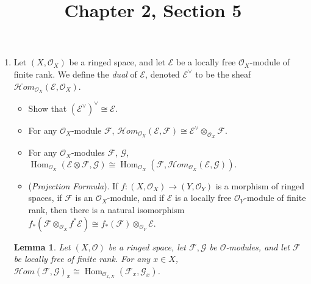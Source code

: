 \documentclass{article}
\title{Chapter 2, Section 5}
\newcommand{\fF}{\mathcal{F}}
\newcommand{\fG}{\mathcal{G}}
\newcommand{\fE}{\mathcal{E}}
\newcommand{\fO}{\mathcal{O}}
\newtheorem{lemma}{Lemma}
\DeclareMathOperator{\Hom}{Hom}
\begin{document}
\maketitle
\begin{enumerate} [label=\textbf{\arabic*.}, leftmargin=0em]


\item[\textbf{1.}] Let $(X, \fO_X)$ be a ringed space, and let $\fE$ be a locally free $\fO_X$-module of finite rank. We define the \textit{dual} of $\fE$, denoted $\fE^\vee$ to be the sheaf $\mathcal{H}om_{\fO_X}(\fE, \fO_X)$.
\begin{itemize} [leftmargin=0em]
    \item[(a)] Show that $(\fE^\vee)^\vee \cong \fE$.
    \item[(b)] For any $\fO_X$-module $\fF$, $\mathcal{H}om_{\fO_X}(\fE, \fF) \cong \fE^\vee \otimes_{\fO_X} \fF$.
    \item[(c)] For any $\fO_X$-modules $\fF$, $\fG$, $\Hom_{\fO_X}(\fE \otimes \fF, \fG) \cong \Hom_{\fO_X}(\fF, \mathcal{H}om_{\fO_X}(\fE, \fG)).$
    \item[(d)] (\textit{Projection Formula}). If $f : (X, \fO_X) \to (Y, \fO_Y)$ is a morphism of ringed spaces, if $\fF$ is an $\fO_X$-module, and if $\fE$ is a locally free $\fO_Y$-module of finite rank, then there is a natural isomorphism $f_*(\fF \otimes_{\fO_X} f^* \fE) \cong f_*(\fF) \otimes_{\fO_Y} \fE$.
\end{itemize}

\begin{lemma}
    Let $(X, \fO)$ be a ringed space, let $\fF, \fG$ be $\fO$-modules, and let $\fF$ be locally free of finite rank. For any $x \in X$, $\mathcal{H}om(\fF, \fG)_x \cong \Hom_{\fO_{x, X}}(\fF_x, \fG_x)$.
\end{lemma}


\end{enumerate}
\end{document}
